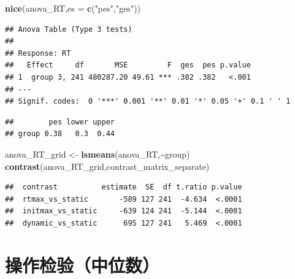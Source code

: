 \documentclass[
]{article}
\newenvironment{Shaded}{\begin{snugshade}}{\end{snugshade}}
\newcommand{\AttributeTok}[1]{\textcolor[rgb]{0.13,0.29,0.53}{#1}}
\newcommand{\DecValTok}[1]{\textcolor[rgb]{0.00,0.00,0.81}{#1}}
\newcommand{\FunctionTok}[1]{\textcolor[rgb]{0.13,0.29,0.53}{\textbf{#1}}}
\newcommand{\NormalTok}[1]{#1}
\newcommand{\OtherTok}[1]{\textcolor[rgb]{0.56,0.35,0.01}{#1}}
\newcommand{\SpecialCharTok}[1]{\textcolor[rgb]{0.81,0.36,0.00}{\textbf{#1}}}
\newcommand{\StringTok}[1]{\textcolor[rgb]{0.31,0.60,0.02}{#1}}
\begin{document}
\begin{Shaded}
\begin{Highlighting}[]
\FunctionTok{nice}\NormalTok{(anova\_RT,}\AttributeTok{es =} \FunctionTok{c}\NormalTok{(}\StringTok{"pes"}\NormalTok{,}\StringTok{"ges"}\NormalTok{))}
\end{Highlighting}
\end{Shaded}

\begin{verbatim}
## Anova Table (Type 3 tests)
## 
## Response: RT
##   Effect     df       MSE         F  ges  pes p.value
## 1  group 3, 241 480287.20 49.61 *** .382 .382   <.001
## ---
## Signif. codes:  0 '***' 0.001 '**' 0.01 '*' 0.05 '+' 0.1 ' ' 1
\end{verbatim}

\begin{Shaded}
\end{Shaded}

\begin{verbatim}
##        pes lower upper
## group 0.38   0.3  0.44
\end{verbatim}

\begin{Shaded}
\begin{Highlighting}[]
\NormalTok{anova\_RT\_grid }\OtherTok{\textless{}{-}} \FunctionTok{lsmeans}\NormalTok{(anova\_RT,}\SpecialCharTok{\textasciitilde{}}\NormalTok{group)}
\FunctionTok{contrast}\NormalTok{(anova\_RT\_grid,contrast\_matrix\_separate)}
\end{Highlighting}
\end{Shaded}

\begin{verbatim}
##  contrast          estimate  SE  df t.ratio p.value
##  rtmax_vs_static       -589 127 241  -4.634  <.0001
##  initmax_vs_static     -639 124 241  -5.144  <.0001
##  dynamic_vs_static      695 127 241   5.469  <.0001
\end{verbatim}

\section{操作检验（中位数）}\label{ux64cdux4f5cux68c0ux9a8cux4e2dux4f4dux6570}
\end{document}
